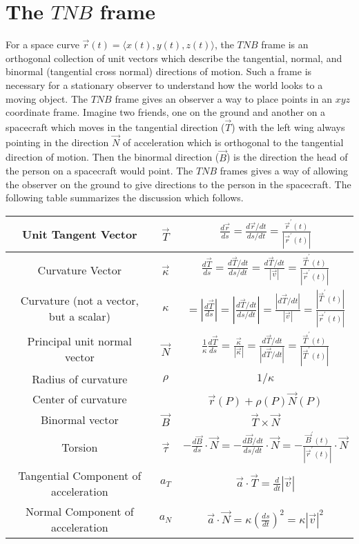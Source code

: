 \section{The $TNB$ frame}

For a space curve $\vec r(t) = \langle x(t),y(t),z(t)\rangle$, the $TNB$ frame is
an orthogonal collection of unit vectors which describe the
tangential, normal, and binormal (tangential cross normal) directions
of motion. Such a frame is necessary for a stationary observer to
understand how the world looks to a moving object.  The $TNB$ frame
gives an observer a way to place points in an $xyz$ coordinate frame.
Imagine two friends, one on the ground and another on a spacecraft
which moves in the tangential direction ({$ \vec T $}) with the left
wing always pointing in the direction $\vec N$ of acceleration which
is orthogonal to the tangential direction of motion. Then the binormal
direction ({$ \vec B $}) is the direction the head of the person on a
spacecraft would point. The $TNB$ frames gives a way of allowing the
observer on the ground to give directions to the person in the
spacecraft. The following table summarizes the discussion which
follows.

 
\begin{center}
\begin{tabular}{|c|c|c|}
\hline
Unit Tangent Vector & $\vec T$ & $\frac{d\vec r}{ds} = \frac{d\vec
r/dt}{ds/dt} = \frac{\vec r^\prime(t)}{|\vec r^\prime(t)|}$\\\hline
Curvature Vector & $\vec \kappa $& $\frac{d\vec T}{ds} =\frac{d\vec
T/dt}{ds/dt} = \frac{d\vec T/dt}{|\vec v|} = \frac{\vec T^\prime(t)}{|\vec
r^\prime(t)|} $\\\hline
Curvature (not a vector, but a scalar)& $ \kappa $&$= \left|\frac{d\vec
T}{ds}\right| =\left|\frac{d\vec T/dt}{ds/dt}\right| =
\frac{\left|d\vec T/dt\right|}{|\vec v|}= \frac{|\vec T^\prime(t)|}{|\vec
r^\prime(t)|}  $ \\\hline
Principal unit normal vector & $ \vec N$& $ \frac{1}{\kappa}\frac{d\vec
T}{ds} = \frac{\vec \kappa }{|\vec \kappa |} = \frac{d\vec T/dt}{|d\vec T/dt|} = \frac{\vec T^\prime(t)}{|\vec
T^\prime(t)|}$\\\hline
Radius of curvature & $ \rho$ & $1/\kappa$\\\hline
Center of curvature &  & $\vec r(P)+\rho(P)\vec N(P)$ \\\hline
Binormal vector & $ \vec B$& $ \vec T\times\vec N$\\\hline
Torsion & $ \vec \tau $ & $ -\frac{d\vec B}{ds}\cdot \vec N = -\frac{d\vec
B/dt}{ds/dt}\cdot \vec N = -\frac{\vec B^\prime(t)}{|\vec r^\prime(t)|}\cdot \vec N
$\\\hline
Tangential Component of acceleration & $ a_T$ & $ \vec a \cdot \vec T =
\frac{d}{dt}|\vec v|$\\\hline
Normal Component of acceleration & $ a_N$ & $ \vec a \cdot \vec N = \kappa
\left(\frac{ds}{dt}\right)^2 = \kappa |\vec v|^2$\\\hline
\end{tabular}
\end{center}
 
